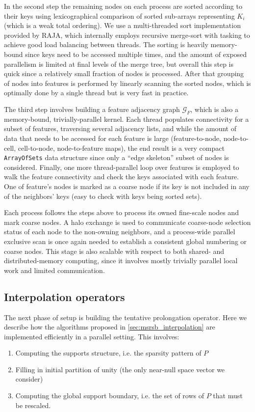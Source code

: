 In the second step the remaining nodes on each process are sorted according to their keys using lexicographical comparison of sorted sub-arrays representing $K_i$ (which is a weak total ordering).   We use a multi-threaded sort implementation provided by RAJA, which internally employs recursive merge-sort with tasking to achieve good load balancing between threads.   The sorting is heavily memory-bound since keys need to be accessed multiple times, and the amount of exposed parallelism is limited at final levels of the merge tree, but overall this step is quick since a relatively small fraction of nodes is processed.   After that grouping of nodes into features is performed by linearly scanning the sorted nodes, which is optimally done by a single thread but is very fast in practice.

The third step involves building a feature adjacency graph $\mathcal{G}_F$, which is also a memory-bound, trivially-parallel kernel.   Each thread populates connectivity for a subset of features, traversing several adjacency lists, and while the amount of data that needs to be accessed for each feature is large (feature-to-node, node-to-cell, cell-to-node, node-to-feature maps), the end result is a very compact \texttt{ArrayOfSets} data structure since only a ``edge skeleton'' subset of nodes is considered.   Finally, one more thread-parallel loop over features is employed to walk the feature connectivity and check the keys associated with each feature.   One of feature's nodes is marked as a coarse node if its key is not included in any of the neighbors' keys (easy to check with keys being sorted sets).

Each process follows the steps above to process its owned fine-scale nodes and mark coarse nodes.   A halo exchange is used to communicate coarse-node selection status of each node to the non-owning neighbors, and a process-wide parallel exclusive scan is once again needed to establish a consistent global numbering or coarse nodes.   This stage is also scalable with respect to both shared- and distributed-memory computing, since it involves mostly trivially parallel local work and limited communication.

\subsection{Interpolation operators}
\label{subsec:par_kernels_support}

The next phase of setup is building the tentative prolongation operator.   Here we describe how the algorithms proposed in \cref{sec:msrsb_interpolation} are implemented efficiently in a parallel setting.   This involves:
\begin{enumerate}
    \item Computing the supports structure, i.e. the sparsity pattern of $P$
    \item Filling in initial partition of unity (the only near-null space vector we consider)
    \item Computing the global support boundary, i.e. the set of rows of $P$ that must be rescaled.
\end{enumerate}

